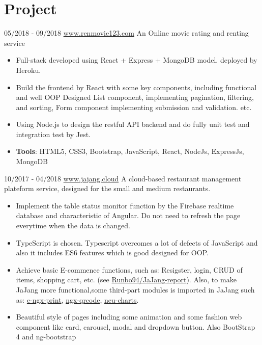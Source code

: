 \documentclass[letterpaper]{twentysecondcv} %
\begin{document}
\section{Project}
\begin{twenty}
	\twentyitem
	{05/2018}
	{- 09/2018}
	{\href{www.renmovie123.com}{www.renmovie123.com}}
	{}
	{An Online movie rating and renting service}
	{
		{\begin{itemize}
				\item Full-stack developed using React + Express + MongoDB model.
				deployed by Heroku.
				\item Build the frontend by React with some key components, including functional and well OOP Designed List component, implementing pagination, filtering, and sorting, Form component implementing submission and validation. etc.
				\item Using Node.js to design the restful API backend and do fully unit test and integration test by Jest.
				\item \textbf{Tools}: HTML5, CSS3, Bootstrap, JavaScript, React, NodeJs, ExpressJs, MongoDB  \vspace{2mm}
		\end{itemize}}
	}
	\twentyitem
	{10/2017}
	{- 04/2018}
	{\href{www.jajang.cloud}{www.jajang.cloud}}
	{}
	{A cloud-based restaurant management plateform service, designed for the small and medium restaurants.}
	{
		{\begin{itemize}
				\item Implement the table status monitor function by the Firebase realtime database and characteristic of Angular. Do not need to refresh the page everytime when the data is changed. 
				\item TypeScript is chosen. Typescript overcomes a lot of defects of JavaScript and also it includes ES6 features which is good designed for OOP. 
				\item Achieve basic E-commence functions, such as: Resigster, login, CRUD of items, shopping cart, etc. (see \href{https://github.com/Runbo94/JaJang-report}{Runbo94/JaJang-report}). Also, to make JaJang more functional,some third-part modules is imported in JaJang such as: \href{https://github.com/laixiangran/e-ngx-print}{e-ngx-print}, \href{https://github.com/nacardin/ngx-qrcode}{ngx-qrcode}, 
				\href{https://www.npmjs.com/package/neu-charts}{neu-charts}.
				\item Beautiful style of pages including some animation and some fashion web component like card, carousel, modal and dropdown button. Also BootStrap 4 and ng-bootstrap

\end{itemize}}}
\end{twenty}
\end{document}
